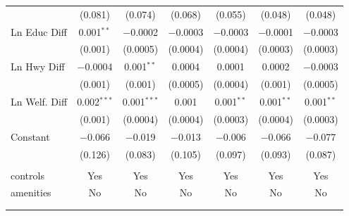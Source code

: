 \begin{table}[!htbp]
\begin{tabular}{@{\extracolsep{5pt}}lcccccc}
  & (0.081) & (0.074) & (0.068) & (0.055) & (0.048) & (0.048) \\ 
  Ln Educ Diff & 0.001$^{**}$ & $-$0.0002 & $-$0.0003 & $-$0.0003 & $-$0.0001 & $-$0.0003 \\ 
  & (0.001) & (0.0005) & (0.0004) & (0.0004) & (0.0003) & (0.0003) \\ 
  Ln Hwy Diff & $-$0.0004 & 0.001$^{**}$ & 0.0004 & 0.0001 & 0.0002 & $-$0.0003 \\ 
  & (0.001) & (0.001) & (0.0005) & (0.0004) & (0.001) & (0.0005) \\ 
  Ln Welf. Diff & 0.002$^{***}$ & 0.001$^{***}$ & 0.001 & 0.001$^{**}$ & 0.001$^{**}$ & 0.001$^{**}$ \\ 
  & (0.001) & (0.0004) & (0.0004) & (0.0003) & (0.0004) & (0.0003) \\ 
  Constant & $-$0.066 & $-$0.019 & $-$0.013 & $-$0.006 & $-$0.066 & $-$0.077 \\ 
  & (0.126) & (0.083) & (0.105) & (0.097) & (0.093) & (0.087) \\ 
 \hline \\[-1.8ex] 
controls & Yes & Yes & Yes & Yes & Yes & Yes \\ 
amenities & No & No & No & No & No & No \\ 
\hline \\[-1.8ex] 
\hline 
\hline \\[-1.8ex] 
\end{tabular} 
\end{table} 

